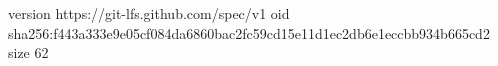 version https://git-lfs.github.com/spec/v1
oid sha256:f443a333e9e05cf084da6860bac2fc59cd15e11d1ec2db6e1eccbb934b665cd2
size 62
